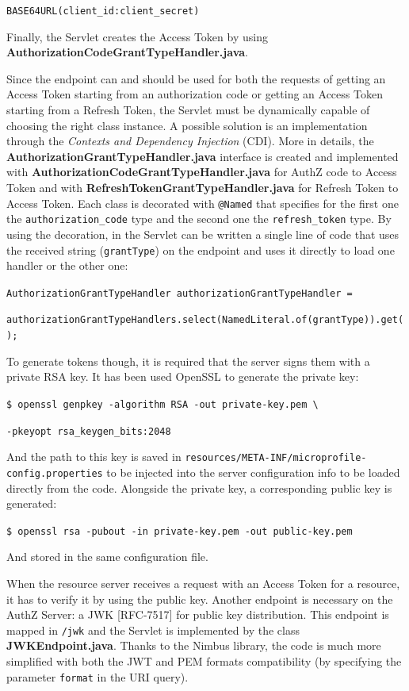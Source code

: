 \documentclass[a4paper,12pt]{article}
\def\rfc#1{RFC-#1\xspace}
\begin{document}
\quad  \texttt{BASE64URL(client\_id:client\_secret)}

Finally, the Servlet creates the Access Token by using \textbf{AuthorizationCodeGrantTypeHandler.java}. 

Since the endpoint can and should be used for both the requests of getting an Access Token starting from an authorization code or getting an Access Token starting from a Refresh Token, the Servlet must be dynamically capable of choosing the right class instance. A possible solution is an implementation through the \textit{Contexts and Dependency Injection} (CDI). More in details, the \textbf{AuthorizationGrantTypeHandler.java} interface is created and implemented with \textbf{AuthorizationCodeGrantTypeHandler.java} for AuthZ code to Access Token and with \textbf{RefreshTokenGrantTypeHandler.java} for Refresh Token to Access Token. Each class is decorated with \texttt{@Named} that specifies for the first one the \texttt{authorization\_code} type and the second one the \texttt{refresh\_token} type. By using the decoration, in the Servlet can be written a single line of code that uses the received string (\texttt{grantType}) on the endpoint and uses it directly to load one handler or the other one:

\quad \texttt{AuthorizationGrantTypeHandler authorizationGrantTypeHandler = } 

\hspace{1cm} \texttt{authorizationGrantTypeHandlers.select(NamedLiteral.of(grantType)).get();}

To generate tokens though, it is required that the server signs them with a private RSA key. It has been used OpenSSL to generate the private key:
 
\quad \texttt{\$ openssl genpkey -algorithm RSA -out private-key.pem \textbackslash}
  
\hspace{1cm} \texttt{-pkeyopt rsa\_keygen\_bits:2048}

And the path to this key is saved in \texttt{resources/META-INF/microprofile-config.properties} to be injected into the server configuration info to be loaded directly from the code. Alongside the private key, a corresponding public key is generated:
 
\quad \texttt{\$ openssl rsa -pubout -in private-key.pem -out public-key.pem}

And stored in the same configuration file.

When the resource server receives a request with an Access Token for a resource, it has to verify it by using the public key. Another endpoint is necessary on the AuthZ Server: a JWK [\rfc{7517}] for public key distribution. This endpoint is mapped in \texttt{/jwk} and the Servlet is implemented by the class \textbf{JWKEndpoint.java}. Thanks to the Nimbus library, the code is much more simplified with both the JWT and PEM formats compatibility (by specifying the parameter \texttt{format} in the URI query).
\end{document}
